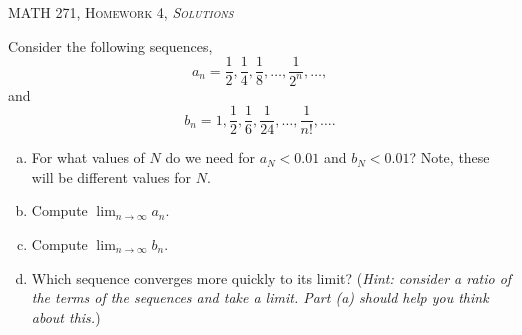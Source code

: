 \documentclass[12pt]{article} %
\begin{document}
\begin{center}
   \textsc{\large MATH 271, Homework 4, \emph{Solutions}}\\
\end{center}
\vspace{.5cm}

\begin{problem}
Consider the following sequences,
\[
a_n = \frac{1}{2}, \frac{1}{4}, \frac{1}{8}, \dots, \frac{1}{2^n}, \dots,
\]
and
\[
b_n =  1, \frac{1}{2}, \frac{1}{6},\frac{1}{24}, \dots,\frac{1}{n!}, \dots.
\]
\begin{enumerate}[(a)]
    \item For what values of $N$ do we need for $a_N<0.01$ and $b_N<0.01$? Note, these will be different values for $N$.
    \item Compute $\displaystyle{\lim_{n\to \infty} a_n}$.
    \item Compute $\displaystyle{\lim_{n\to \infty} b_n}$.
    \item Which sequence converges more quickly to its limit? (\emph{Hint: consider a ratio of the terms of the sequences and take a limit. Part (a) should help you think about this.})
\end{enumerate}
\end{problem}
\end{document}
